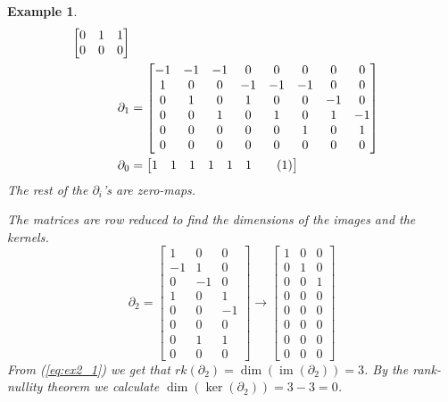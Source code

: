 \documentclass[11pt,a4paper,twoside, openright]{report}
\newtheorem{myex}[mythm]{Example}
\newcommand\numberthis{\addtocounter{equation}{1}\tag{\theequation}}
\DeclareMathOperator{\im}{im}
\begin{document}
\begin{myex}
\begin{align*}
\begin{bmatrix}
0 & 1 & 1 \\
0 & 0 & 0 
\end{bmatrix}
\\
\partial_1&=
\begin{bmatrix}
-1 & -1 & -1 & 0 & 0 & 0 & 0 & 0 \\
1 & 0 & 0 & -1 & -1 & -1 & 0 & 0 \\
0 & 1 & 0 & 1 & 0 & 0 & -1 & 0 \\
0 & 0 & 1 & 0 & 1 & 0 & 1 & -1 \\
0 & 0 & 0 & 0 & 0 & 1 & 0 & 1 \\
0 & 0 & 0 & 0 & 0 & 0 & 0 & 0 
\end{bmatrix}
\\
\partial_0&=
\begin{bmatrix}
1 & 1 & 1 & 1 & 1 & 1 \numberthis \label{eq:ex2_0}
\end{bmatrix}
\end{align*} 
The rest of the $\partial_i$'s are zero-maps.

The matrices are row reduced to find the dimensions of the images and the kernels.
\begin{equation}\label{eq:ex2_1}
\partial_2=
\begin{bmatrix}
1 & 0 & 0 \\
-1 & 1 & 0 \\
0 & -1 & 0 \\
1 & 0 & 1 \\
0 & 0 & -1 \\
0 & 0 & 0 \\
0 & 1 & 1 \\
0 & 0 & 0 
\end{bmatrix}
\to
\begin{bmatrix}
1 & 0 & 0 \\
0 & 1 & 0 \\
0 & 0 & 1 \\
0 & 0 & 0 \\
0 & 0 & 0 \\
0 & 0 & 0 \\
0 & 0 & 0 \\
0 & 0 & 0 
\end{bmatrix}
\end{equation}
From (\ref{eq:ex2_1}) we get that $rk(\partial_2)=\dim(\im(\partial_2))=3$. By the rank-nullity theorem we calculate $\dim(\ker(\partial_2))=3-3=0$.


\end{myex}
\end{document}

